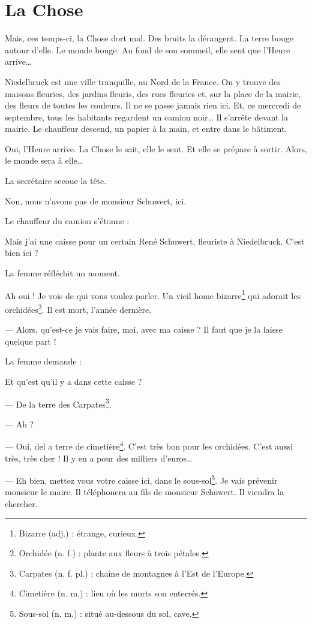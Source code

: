 \chapter{La Chose}
Mais, ces temps-ci, la Chose dort mal. Des bruits la dérangent. La terre bouge autour d'elle. Le monde bouge. Au fond de
son sommeil, elle sent que l'Heure arrive\ldots{}

Niedelbruck est une ville tranquille, au Nord de la France. On y trouve des maisons fleuries, des jardins fleuris,
des rues fleuries et, sur la place de la mairie, des fleurs de toutes les couleurs. Il ne se passe jamais rien ici.
Et, ce mercredi de septembre, tous les habitants regardent un camion noir\ldots{} Il s'arrête devant la mairie. Le
chauffeur descend, un papier à la main, et entre dans le bâtiment.

Oui, l'Heure arrive. La Chose le sait, elle le sent. Et elle se prépare à sortir. Alors, le monde sera à elle\ldots{}

La secrétaire secoue la tête.

\og{} Non, nous n'avons pas de monsieur Schuwert, ici. \fg{}

Le chauffeur du camion s'étonne :

\og{} Mais j'ai une caisse pour un certain René Schuwert, fleuriste à Niedelbruck. C'est bien ici ? \fg{}

La femme réfléchit un moment.

\og{} Ah oui ! Je vois de qui vous voulez parler. Un vieil home bizarre\footnote{Bizarre (adj.) : étrange, curieux.}
qui adorait les orchidées\footnote{Orchidée (n. f.) : plante aux fleurs à trois pétales.}. Il est mort, l'année
dernière.

--- Alors, qu'est-ce je vais faire, moi, avec ma caisse ? Il faut que je la laisse quelque part ! \fg{}

La femme demande :

\og Et qu'est qu'il y a dans cette caisse ?

--- De la terre des Carpates\footnote{Carpates (n. f. pl.) : chaîne de montagnes à l'Est de l'Europe.}.

--- Ah ?

--- Oui, del a terre de cimetière\footnote{Cimetière (n. m.) : lieu où les morts son enterrés.}. C'est très bon pour
    les orchidées. C'est aussi très, très cher ! Il y en a pour des milliers d'euros\ldots{}

--- Eh bien, mettez vous votre caisse ici, dans le sous-sol\footnote{Sous-sol (n. m.) : situé au-dessous du sol, cave.}.
    Je vais prévenir monsieur le maire. Il téléphonera au fils de monsieur Schuwert. Il viendra la chercher.

